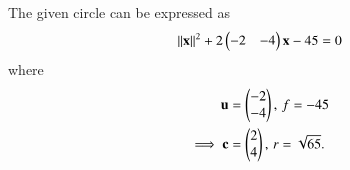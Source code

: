 The given circle can be expressed as
\begin{align}
    \label{eq:chapters/11/11/1/7/given} 
    \left\lVert\mathbf{x}\right\rVert^2  + 2\begin{pmatrix}-2 & -4\end{pmatrix}\mathbf{x} - 45 = 0
\end{align}
where
\begin{align}	
	\mathbf{u} &= \begin{pmatrix}-2\\-4\end{pmatrix},\, f = -45 \\
	\implies \mathbf{c} &= \begin{pmatrix}2\\4\end{pmatrix},\,
	r = \sqrt{65}.	
\end{align}

